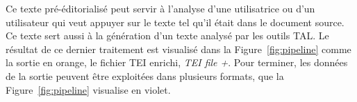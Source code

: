 \documentclass[class=article, crop=false]{standalone}
\begin{document}
Ce texte pré-éditorialisé peut servir à l'analyse d'une utilisatrice ou d'un utilisateur qui veut appuyer sur le texte tel qu'il était dans le document source. Ce texte sert aussi à la génération d'un texte analysé par les outils \acrshort{TAL}. Le résultat de ce dernier traitement est visualisé dans la Figure~\ref{fig:pipeline} comme la sortie en orange, le fichier \acrshort{TEI} enrichi, \textit{TEI file +}. Pour terminer, les données de la sortie peuvent être exploitées dans plusieurs formats, que la Figure~\ref{fig:pipeline} visualise en violet.
\end{document}
